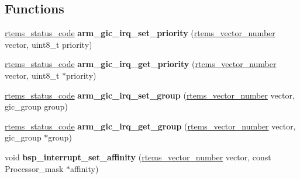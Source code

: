 \subsection*{Functions}
\begin{DoxyCompactItemize}
\item 
\mbox{\label{arm-gic-irq_8h_aae5011b090a49af5a237e1a835a39381}} 
\mbox{\hyperlink{group__ClassicStatus_ga545d41846817eaba6143d52ee4d9e9fe}{rtems\+\_\+status\+\_\+code}} {\bfseries arm\+\_\+gic\+\_\+irq\+\_\+set\+\_\+priority} (\mbox{\hyperlink{group__ClassicINTR_ga3e434c197d99f128e78cae4d9358bd8b}{rtems\+\_\+vector\+\_\+number}} vector, uint8\+\_\+t priority)
\item 
\mbox{\label{arm-gic-irq_8h_a9593270f4f1d71acf2f5fa992c563c75}} 
\mbox{\hyperlink{group__ClassicStatus_ga545d41846817eaba6143d52ee4d9e9fe}{rtems\+\_\+status\+\_\+code}} {\bfseries arm\+\_\+gic\+\_\+irq\+\_\+get\+\_\+priority} (\mbox{\hyperlink{group__ClassicINTR_ga3e434c197d99f128e78cae4d9358bd8b}{rtems\+\_\+vector\+\_\+number}} vector, uint8\+\_\+t $\ast$priority)
\item 
\mbox{\label{arm-gic-irq_8h_a097ba35c77cc535ca5e9a2b230aaa488}} 
\mbox{\hyperlink{group__ClassicStatus_ga545d41846817eaba6143d52ee4d9e9fe}{rtems\+\_\+status\+\_\+code}} {\bfseries arm\+\_\+gic\+\_\+irq\+\_\+set\+\_\+group} (\mbox{\hyperlink{group__ClassicINTR_ga3e434c197d99f128e78cae4d9358bd8b}{rtems\+\_\+vector\+\_\+number}} vector, gic\+\_\+group group)
\item 
\mbox{\label{arm-gic-irq_8h_a98d8ac8bc73b6f5ef1ec814df251d7cd}} 
\mbox{\hyperlink{group__ClassicStatus_ga545d41846817eaba6143d52ee4d9e9fe}{rtems\+\_\+status\+\_\+code}} {\bfseries arm\+\_\+gic\+\_\+irq\+\_\+get\+\_\+group} (\mbox{\hyperlink{group__ClassicINTR_ga3e434c197d99f128e78cae4d9358bd8b}{rtems\+\_\+vector\+\_\+number}} vector, gic\+\_\+group $\ast$group)
\item 
\mbox{\label{arm-gic-irq_8h_a8925aa2097da48998f8a610686f63180}} 
void {\bfseries bsp\+\_\+interrupt\+\_\+set\+\_\+affinity} (\mbox{\hyperlink{group__ClassicINTR_ga3e434c197d99f128e78cae4d9358bd8b}{rtems\+\_\+vector\+\_\+number}} vector, const Processor\+\_\+mask $\ast$affinity)
\item 
\mbox{\label{arm-gic-irq_8h_a3996d9afea8476b04bb432f07e199cd0}} 

\end{DoxyCompactItemize}
